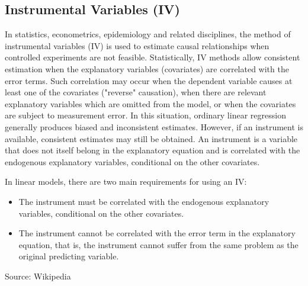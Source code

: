 \documentclass[12pt,a4paper]{article}
\begin{document}
  \subsection{Instrumental Variables (IV)} %
  \label{sub:IV}
  In statistics, econometrics, epidemiology and related disciplines,
  the method of instrumental variables (IV) is used to estimate
  causal relationships when controlled experiments are not feasible.
  Statistically, IV methods allow consistent estimation when the
  explanatory variables (covariates) are correlated with the error terms.
  Such correlation may occur when the dependent variable causes at least
  one of the covariates ("reverse" causation), when there are relevant
  explanatory variables which are omitted from the model, or when the
  covariates are subject to measurement error. In this situation, ordinary
  linear regression generally produces biased and inconsistent estimates.
  However, if an instrument is available, consistent estimates may still
  be obtained. An instrument is a variable that does not itself belong
  in the explanatory equation and is correlated with the endogenous
  explanatory variables, conditional on the other covariates. 

  In linear models, there are two main requirements for using an IV:
  \begin{itemize}
    \item The instrument must be correlated with the endogenous explanatory variables, conditional on the other covariates.
    \item The instrument cannot be correlated with the error term in the explanatory equation, that is, the instrument cannot suffer from the same problem as the original predicting variable.
  \end{itemize}
  \footnotesize{Source: Wikipedia}
  
\end{document}
